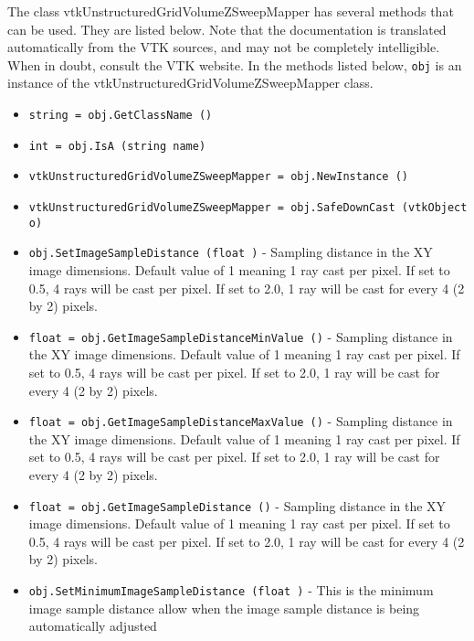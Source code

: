 The class vtkUnstructuredGridVolumeZSweepMapper has several methods that can be used.
  They are listed below.
Note that the documentation is translated automatically from the VTK sources,
and may not be completely intelligible.  When in doubt, consult the VTK website.
In the methods listed below, \verb|obj| is an instance of the vtkUnstructuredGridVolumeZSweepMapper class.
\begin{itemize}
\item  \verb|string = obj.GetClassName ()|

\item  \verb|int = obj.IsA (string name)|

\item  \verb|vtkUnstructuredGridVolumeZSweepMapper = obj.NewInstance ()|

\item  \verb|vtkUnstructuredGridVolumeZSweepMapper = obj.SafeDownCast (vtkObject o)|

\item  \verb|obj.SetImageSampleDistance (float )| -  Sampling distance in the XY image dimensions. Default value of 1 meaning
 1 ray cast per pixel. If set to 0.5, 4 rays will be cast per pixel. If
 set to 2.0, 1 ray will be cast for every 4 (2 by 2) pixels.

\item  \verb|float = obj.GetImageSampleDistanceMinValue ()| -  Sampling distance in the XY image dimensions. Default value of 1 meaning
 1 ray cast per pixel. If set to 0.5, 4 rays will be cast per pixel. If
 set to 2.0, 1 ray will be cast for every 4 (2 by 2) pixels.

\item  \verb|float = obj.GetImageSampleDistanceMaxValue ()| -  Sampling distance in the XY image dimensions. Default value of 1 meaning
 1 ray cast per pixel. If set to 0.5, 4 rays will be cast per pixel. If
 set to 2.0, 1 ray will be cast for every 4 (2 by 2) pixels.

\item  \verb|float = obj.GetImageSampleDistance ()| -  Sampling distance in the XY image dimensions. Default value of 1 meaning
 1 ray cast per pixel. If set to 0.5, 4 rays will be cast per pixel. If
 set to 2.0, 1 ray will be cast for every 4 (2 by 2) pixels.

\item  \verb|obj.SetMinimumImageSampleDistance (float )| -  This is the minimum image sample distance allow when the image
 sample distance is being automatically adjusted


\end{itemize}
